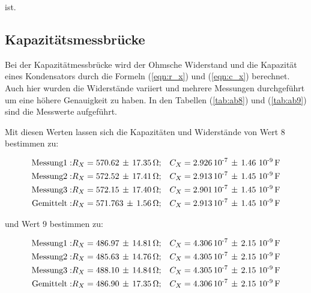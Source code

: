 ist. %

\subsection{Kapazitätsmessbrücke}

Bei der Kapazitätmessbrücke wird der Ohmsche Widerstand und die Kapazität eines Kondensators durch die Formeln (\ref{eqn:r_x}) und (\ref{eqn:c_x}) berechnet. Auch hier wurden die 
Widerstände variiert und mehrere Messungen durchgeführt um eine höhere Genauigkeit zu haben.
In den Tabellen (\ref{tab:ab8}) und (\ref{tab:ab9}) sind die Messwerte aufgeführt.

Mit diesen Werten lassen sich die Kapazitäten und Widerstände von Wert 8 bestimmen zu:

\begin{align*}
\text{Messung}1:& R_X = 570.62    \, \pm \, 17.35 \,  \si{\ohm};  & C_X = 2.926  \, 10\textsuperscript{-7}  \, \pm \, 1.46 \,  \, 10\textsuperscript{-9}  \, \si{\farad}\\
\text{Messung}2:& R_X = 572.52    \, \pm \, 17.41 \,  \si{\ohm};  & C_X = 2.913  \, 10\textsuperscript{-7}  \, \pm \, 1.45 \, \, 10\textsuperscript{-9}  \,  \si{\farad}\\
\text{Messung}3:& R_X = 572.15    \, \pm \, 17.40 \,  \si{\ohm};  & C_X = 2.901  \, 10\textsuperscript{-7}  \, \pm \, 1.45 \, \, 10\textsuperscript{-9}  \,  \si{\farad}\\
\text{Gemittelt}:& R_X = 571.763  \, \pm \, 1.56 \,  \si{\ohm};& C_X = 2.913  \, 10\textsuperscript{-7}     \, \pm \, 1.45 \, \, 10\textsuperscript{-9}  \, \si{\farad}\\
\end{align*}

und Wert 9 bestimmen zu:

\begin{align*}
\text{Messung}1:&  R_X = 486.97  \, \pm \, 14.81 \, \si{\ohm};& C_X = 4.306  \, 10\textsuperscript{-7}  \, \pm \, 2.15 \,  \, 10\textsuperscript{-9}  \, \si{\farad}\\
\text{Messung}2:&  R_X = 485.63  \, \pm \, 14.76 \, \si{\ohm};& C_X = 4.305  \, 10\textsuperscript{-7}  \, \pm \, 2.15 \,  \, 10\textsuperscript{-9}  \, \si{\farad}\\
\text{Messung}3:&  R_X = 488.10  \, \pm \, 14.84 \, \si{\ohm};& C_X = 4.305  \, 10\textsuperscript{-7}  \, \pm \, 2.15 \,  \, 10\textsuperscript{-9}  \, \si{\farad}\\
\text{Gemittelt}:& R_X = 486.90  \, \pm \, 17.35 \, \si{\ohm};& C_X = 4.306  \, 10\textsuperscript{-7}  \, \pm \, 2.15 \,  \, 10\textsuperscript{-9}  \, \si{\farad}\\
\end{align*}

